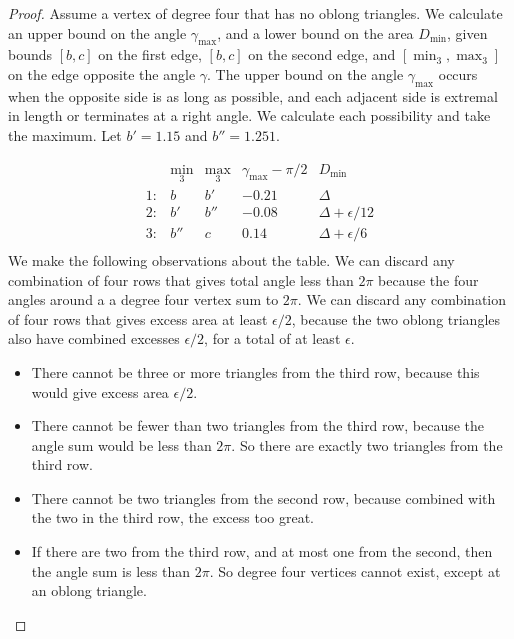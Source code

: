 \begin{proof}  Assume a vertex of degree four that has no oblong triangles.
We calculate an upper bound on the angle $\gamma_{\max}$, and a
lower bound on the area $D_{\min}$, given bounds $[b,c]$ on the
first edge, $[b,c]$ on the second edge, and $[\min_3,\max_3]$ on
the edge opposite the angle $\gamma$.  The upper bound on the
angle $\gamma_{\max}$ occurs when the opposite side is as long as
possible, and each adjacent side is extremal in length or
terminates at a right angle.  We calculate each possibility and
take the maximum.  Let $b'=1.15$ and $b''=1.251$.

$$
    \begin{array}{llllll}
      &\min_3&\max_3   &\gamma_{\max} - \pi/2&   D_{\min}\\
    1:&b     &b'       &-0.21              &\Delta\\
    2:&b'    &b''      &-0.08              &\Delta + \epsilon/12\\
    3:&b''   &c        &0.14               &\Delta + \epsilon/6\\
    \end{array}
$$
We make the following observations about the table.  We can
discard any combination of four rows that gives total angle less
than $2\pi$  because the four angles around a a degree four vertex
sum to $2\pi$.  We can discard any combination of four rows that
gives excess area at least $\epsilon/2$, because the two oblong
triangles also have combined excesses $\epsilon/2$, for a total of
at least $\epsilon$.
\begin{itemize}
    \item There cannot be three or more triangles from the third row,
    because this would give excess area $\epsilon/2$.
    \item  There cannot be fewer than two triangles from the third
    row, because the angle sum would be less than $2\pi$. So there
    are exactly two triangles from the third row.
    \item There cannot be two triangles from the second row,
    because combined with the two in the third row, the
    excess too great.
    \item If there are two from the third row, and at most one
    from the second, then the angle sum is less than $2\pi$.  So
    degree four vertices cannot exist, except at an oblong triangle.
\end{itemize}
\end{proof}


